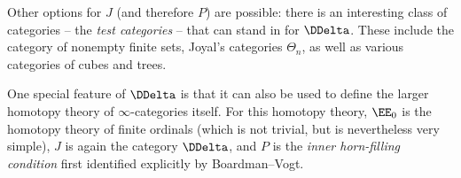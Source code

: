 Other options for $J$ (and therefore $P$) are possible:
there is an interesting class of categories -- the \emph{test categories} -- that can stand in for $\DDelta$. 
These include the category of nonempty finite sets, Joyal's categories $\Theta_n$, as well as various categories of cubes and trees.

One special feature of $\DDelta$ is that it can also be used to define the larger homotopy theory of $\infty$-categories itself.
For this homotopy theory, $\EE_0$ is the homotopy theory of finite ordinals (which is not trivial, but is nevertheless very simple),
$J$ is again the category $\DDelta$,
and $P$ is the \emph{inner horn-filling condition} first identified explicitly by Boardman--Vogt.




